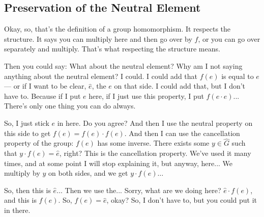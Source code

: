 \subsection{Preservation of the Neutral Element}

\begin{speech}[00:09:02 - 00:10:40]
Okay, so, that's the definition of a group homomorphism. It respects the structure. It says you can multiply here and then go over by $f$, or you can go over separately and multiply. That's what respecting the structure means.

Then you could say: What about the neutral element? Why am I not saying anything about the neutral element? I could. I could add that $f(e)$ is equal to $e$  --- or if I want to be clear, $\hat{e}$, the $e$ on that side. I could add that, but I don't have to. Because if I put $e$ here, if I just use this property, I put $f(e \cdot e)$...  There's only one thing you can do always.

So, I just stick $e$ in here. Do you agree? And then I use the neutral property on this side to get $f(e) = f(e) \cdot f(e)$.  And then I can use the cancellation property of the group: $f(e)$ has some inverse. There exists some $y \in \hat{G}$ such that $y \cdot f(e) = \hat{e}$,  right? This is the cancellation property. We've used it many times, and at some point I will stop explaining it, but anyway, here... We multiply by $y$ on both sides, and we get $y \cdot f(e)\dots$ 

So, then this is $\hat{e} \dots$ Then we use the... Sorry, what are we doing here? $\hat{e} \cdot f(e)$,  and this is $f(e)$.  So, $f(e) = \hat{e}$, okay? So, I don't have to, but you could put it in there.
\end{speech}

